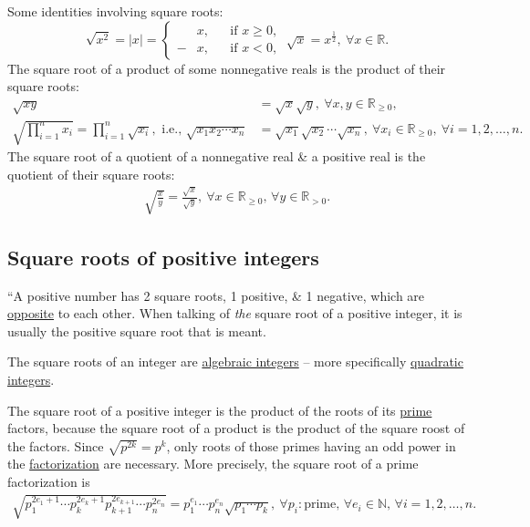 \documentclass{article}
\begin{document}
Some identities involving square roots:
\begin{equation*}
	\boxed{\sqrt{x^2} = |x| = \left\{\begin{split}
		&x,&&\mbox{if } x\ge0,\\
		-&x,&&\mbox{if } x < 0,
	\end{split}\right.\ \sqrt{x} = x^{\frac{1}{2}},\ \forall x\in\mathbb{R}.}
\end{equation*}
The square root of a product of some nonnegative reals is the product of their square roots:
\begin{equation*}
	\boxed{\left.\begin{split}
		\sqrt{xy} &= \sqrt{x}\sqrt{y},\ \forall x,y\in\mathbb{R}_{\ge0},\\
		\sqrt{\prod_{i=1}^n x_i} = \prod_{i=1}^n \sqrt{x_i},\mbox{ i.e., } \sqrt{x_1x_2\cdots x_n} &= \sqrt{x_1}\sqrt{x_2}\cdots\sqrt{x_n},\ \forall x_i\in\mathbb{R}_{\ge0},\ \forall i = 1,2,\ldots,n.
	\end{split}\right.}
\end{equation*}
The square root of a quotient of a nonnegative real \& a positive real is the quotient of their square roots:
\begin{align*}
	\boxed{\sqrt{\frac{x}{y}} = \frac{\sqrt{x}}{\sqrt{y}},\ \forall x\in\mathbb{R}_{\ge0},\,\forall y\in\mathbb{R}_{> 0}.}
\end{align*}

\subsection{Square roots of positive integers}
``A positive number has 2 square roots, 1 positive, \& 1 negative, which are \href{https://en.wikipedia.org/wiki/Opposite_(mathematics)}{opposite} to each other. When talking of \textit{the} square root of a positive integer, it is usually the positive square root that is meant.

The square roots of an integer are \href{https://en.wikipedia.org/wiki/Algebraic_integer}{algebraic integers} -- more specifically \href{https://en.wikipedia.org/wiki/Quadratic_integer}{quadratic integers}.

The square root of a positive integer is the product of the roots of its \href{https://en.wikipedia.org/wiki/Prime_number}{prime} factors, because the square root of a product is the product of the square roost of the factors. Since $\sqrt{p^{2k}} = p^k$, only roots of those primes having an odd power in the \href{https://en.wikipedia.org/wiki/Integer_factorization}{factorization} are necessary. More precisely, the square root of a prime factorization is
\begin{align*}
	\sqrt{p_1^{2e_1 + 1}\cdots p_k^{2e_k + 1}p_{k+1}^{2e_{k+1}}\cdots p_n^{2e_n}} = p_1^{e_1}\cdots p_n^{e_n}\sqrt{p_1\cdots p_k},\ \forall p_i:\mbox{prime},\,\forall e_i\in\mathbb{N},\,\forall i = 1,2,\ldots,n.
\end{align*}
\end{document}
